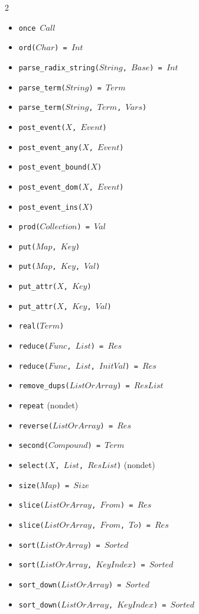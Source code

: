 \documentclass[10pt]{article}
\begin{document}
\begin{multicols}{2}
\begin{scriptsize}
\begin{itemize}
    \item \texttt{once $Call$}
    \item \texttt{ord($Char$) = $Int$} 
    \item \texttt{parse\_radix\_string($String$, $Base$) = $Int$}
    \item \texttt{parse\_term($String$) = $Term$}
    \item \texttt{parse\_term($String$, $Term$, $Vars$)}
    \item \texttt{post\_event($X$, $Event$)}
    \item \texttt{post\_event\_any($X$, $Event$)}
    \item \texttt{post\_event\_bound($X$)}
    \item \texttt{post\_event\_dom($X$, $Event$)}
    \item \texttt{post\_event\_ins($X$)}
    \item \texttt{prod($Collection$) = $Val$}
    \item \texttt{put($Map$, $Key$)} 
    \item \texttt{put($Map$, $Key$, $Val$)} 
    \item \texttt{put\_attr($X$, $Key$)} 
    \item \texttt{put\_attr($X$, $Key$, $Val$)} 
    \item \texttt{real($Term$)} 
    \item \texttt{reduce($Func$, $List$) = $Res$} 
    \item \texttt{reduce($Func$, $List$, $InitVal$) = $Res$} 
    \item \texttt{remove\_dups($ListOrArray$) = $ResList$} 
    \item \texttt{repeat} (nondet)
    \item \texttt{reverse($ListOrArray$) = $Res$} 
    \item \texttt{second($Compound$) = $Term$} 
    \item \texttt{select($X$, $List$, $ResList$)} (nondet)
    \item \texttt{size($Map$) = $Size$}
    \item \texttt{slice($ListOrArray$, $From$) = $Res$}
    \item \texttt{slice($ListOrArray$, $From$, $To$) = $Res$}
    \item \texttt{sort($ListOrArray$) = $Sorted$} 
    \item \texttt{sort($ListOrArray$, $KeyIndex$) = $Sorted$} 
    \item \texttt{sort\_down($ListOrArray$) = $Sorted$} 
    \item \texttt{sort\_down($ListOrArray$, $KeyIndex$) = $Sorted$} 

\end{itemize}
\end{scriptsize}
\end{multicols}
\end{document}
